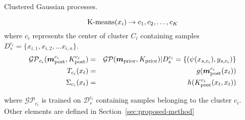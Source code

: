 \begin{algorithm}[t!]
\small
\caption{Clustered Gaussian processes.}%
\begin{algorithmic}[1]
\label{alg:CGP}
\medskip
{}
\begin{equation*}
    {\rm K\mbox{-}means}({x_i}) \rightarrow {c_1, c_2, \ldots, c_K}
\end{equation*}
where $c_i$ represents the center of cluster $C_i$ containing samples $D_s^{c_i}=\{x_{i,1}, x_{i,2}, ... x_{i,n}\}$.
\medskip
{}
\begin{eqnarray*}
\mathcal{GP}_{c_i}(\bm{m}_{\rm post}^{c_i}, K_{\rm post}^{c_i})&=&\mathcal{GP}(\bm{m}_{\rm prior}, K_{\rm prior}) | D_s^{c_i}=\{(\psi(x_{s,c_i}),y_{s,c_i})\}\\
T_{c_i}(x_t) &=& g(\bm{m}_{\rm post}^{c_i}(x_t))\\
\Sigma_{c_i}(x_t) &=& h(K_{\rm post}^{c_i}(x_t,x_t))
\end{eqnarray*}




where $\mathcal{GP}_{c_i}$ is trained on $\mathcal{D}_s^{c_i}$ containing samples belonging to the cluster $c_i$. Other elements are defined in Section~\ref{sec:proposed-method}
\medskip
{}
\end{algorithmic}
\end{algorithm}
\shrink
